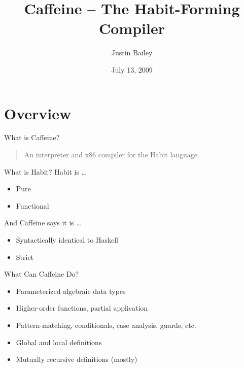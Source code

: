 \documentclass{beamer}
\title{Caffeine -- The Habit-Forming Compiler}
\author{Justin Bailey}
\date{July 13, 2009}
\begin{document}
\VerbatimFootnotes
\DefineShortVerb{\#}

\begin{frame}
\titlepage
\end{frame}

\section{Overview}

\begin{frame}{What is Caffeine?}
  \begin{quote}
    An interpreter and x86 compiler for the Habit language.
  \end{quote}
\end{frame}

\begin{frame}{What is Habit?}
  Habit is \ldots
  \begin{itemize}
  \item Pure
  \item Functional
  \end{itemize}

  And Caffeine says it is \ldots
  \begin{itemize}
  \item Syntactically identical to Haskell
  \item Strict 
  \end{itemize}
\end{frame}

\begin{frame}{What Can Caffeine Do?}
  \begin{itemize}
  \item Parameterized algebraic data types
  \item Higher-order functions, partial application
  \item Pattern-matching, conditionals, case analysis, guards, etc.
  \item Global and local definitions
  \item Mutually recursive definitions (mostly)
  \end{itemize}
\end{frame}

\end{document}
